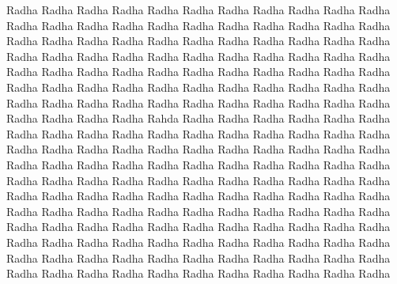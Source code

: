Radha Radha Radha Radha Radha Radha Radha Radha Radha Radha Radha Radha Radha Radha Radha Radha Radha Radha
Radha Radha Radha Radha Radha Radha Radha Radha Radha Radha Radha Radha Radha Radha Radha Radha Radha Radha
Radha Radha Radha Radha Radha Radha Radha Radha Radha Radha Radha Radha Radha Radha Radha Radha Radha Radha
Radha Radha Radha Radha Radha Radha Radha Radha Radha Radha Radha Radha Radha Radha Radha Radha Radha Radha
Radha Radha Radha Radha Radha Radha Radha Radha Radha Rahda Radha Radha Radha Radha Radha Radha Radha Radha
Radha Radha Radha Radha Radha Radha Radha Radha Radha Radha Radha Radha Radha Radha Radha Radha Radha Radha 
Radha Radha Radha Radha Radha Radha Radha Radha Radha Radha Radha Radha Radha Radha Radha Radha Radha Radha
Radha Radha Radha Radha Radha Radha Radha Radha Radha Radha Radha Radha Radha Radha Radha Radha Radha Radha 
Radha Radha Radha Radha Radha Radha Radha Radha Radha Radha Radha Radha Radha Radha Radha Radha Radha Radha
Radha Radha Radha Radha Radha Radha Radha Radha Radha Radha Radha Radha Radha Radha Radha Radha Radha Radha
Radha Radha Radha Radha Radha Radha Radha Radha Radha Radha Radha Radha Radha Radha Radha Radha Radha Radha